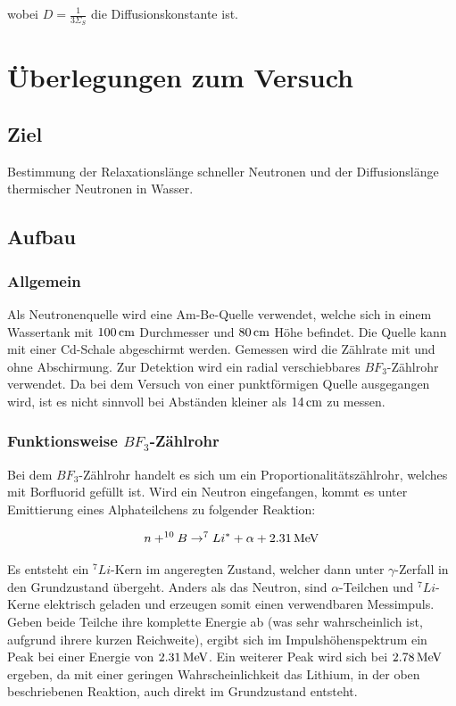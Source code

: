 \documentclass[a4paper,titlepage]{scrartcl}
\numberwithin{equation}{section}
\begin{document}
wobei $D=\frac{1}{3 \Sigma_S}$ die Diffusionskonstante ist.

\section{Überlegungen zum Versuch}
\subsection{Ziel}
Bestimmung der Relaxationslänge schneller Neutronen und der Diffusionslänge thermischer Neutronen in Wasser.
\subsection{Aufbau}
\subsubsection{Allgemein}
Als Neutronenquelle wird eine Am-Be-Quelle verwendet, welche sich in einem Wassertank mit $\unit[100]{cm}$ Durchmesser und $\unit[80]{cm}$ Höhe befindet. Die Quelle kann mit einer Cd-Schale abgeschirmt werden. Gemessen wird die Zählrate mit und ohne Abschirmung. Zur Detektion wird ein radial verschiebbares $BF_3$-Zählrohr verwendet. Da bei dem Versuch von einer punktförmigen Quelle ausgegangen wird, ist es nicht sinnvoll bei Abständen kleiner als $\unit[14]{cm}$ zu messen.

\subsubsection{Funktionsweise $BF_3$-Zählrohr}
Bei dem $BF_3$-Zählrohr handelt es sich um ein Proportionalitätszählrohr, welches mit Borfluorid gefüllt ist. Wird ein Neutron eingefangen, kommt es unter Emittierung eines Alphateilchens zu folgender Reaktion:

\begin{equation}
n+^{10}B \rightarrow ^7Li^* + \alpha + \unit[2.31]{MeV}
\end{equation}

Es entsteht ein $^7Li$-Kern im angeregten Zustand, welcher dann unter $\gamma$-Zerfall in den Grundzustand übergeht. Anders als das Neutron, sind $\alpha$-Teilchen und $^7Li$-Kerne elektrisch geladen und erzeugen somit einen verwendbaren Messimpuls. Geben beide Teilche ihre komplette Energie ab (was sehr wahrscheinlich ist, aufgrund ihrere kurzen Reichweite), ergibt sich im Impulshöhenspektrum ein Peak bei einer Energie von $\unit[2.31]{MeV}$. Ein weiterer Peak wird sich bei $\unit[2.78]{MeV}$ ergeben, da mit einer geringen Wahrscheinlichkeit das Lithium, in der oben beschriebenen Reaktion, auch direkt im Grundzustand entsteht.
\end{document}
